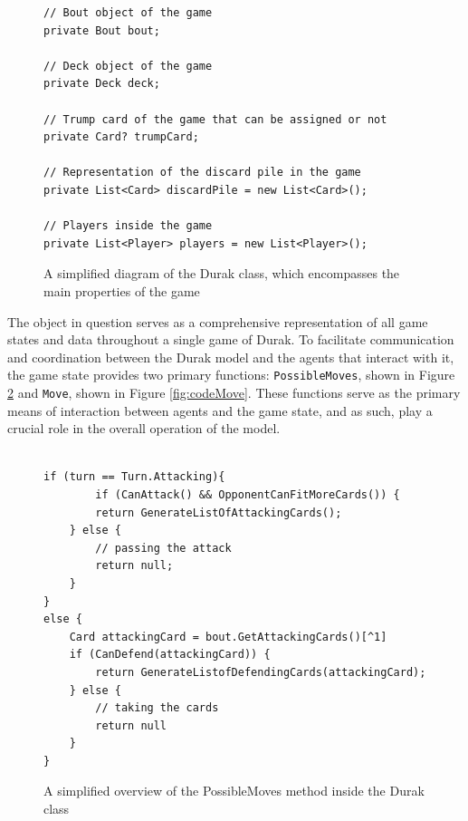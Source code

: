 \begin{figure}[h]
\captionsetup{justification=centering}
\begin{lstlisting}
// Bout object of the game
private Bout bout;

// Deck object of the game
private Deck deck;

// Trump card of the game that can be assigned or not
private Card? trumpCard;

// Representation of the discard pile in the game
private List<Card> discardPile = new List<Card>();

// Players inside the game
private List<Player> players = new List<Player>();

\end{lstlisting}
\caption{A simplified diagram of the Durak class, which encompasses the main properties of the game}
\label{fig:codeDurak}
\end{figure}

The object in question serves as a comprehensive representation of all game states and data throughout a single game of Durak. To facilitate communication and coordination between the Durak model and the agents that interact with it, the game state provides two primary functions: \texttt{PossibleMoves}, shown in Figure \ref{fig:codePossibleMoves} and \texttt{Move}, shown in Figure \ref{fig:codeMove}. These functions serve as the primary means of interaction between agents and the game state, and as such, play a crucial role in the overall operation of the model. 

\begin{figure}[h]
\captionsetup{justification=centering}
\begin{lstlisting}

if (turn == Turn.Attacking){
    	if (CanAttack() && OpponentCanFitMoreCards()) {
		return GenerateListOfAttackingCards();
	} else {
		// passing the attack
		return null;	
	}
}
else {
	Card attackingCard = bout.GetAttackingCards()[^1]
	if (CanDefend(attackingCard)) {
		return GenerateListofDefendingCards(attackingCard);
	} else {
		// taking the cards
		return null
	}
}
\end{lstlisting}
\caption{A simplified overview of the PossibleMoves method inside the Durak class}
\label{fig:codePossibleMoves}
\end{figure}

